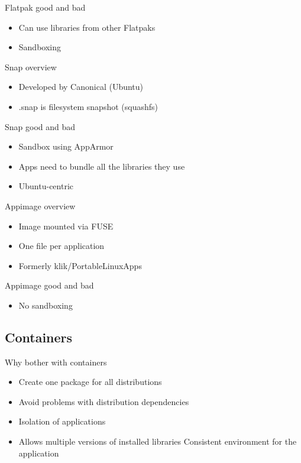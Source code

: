 \documentclass{beamer}
\begin{document}
\begin{frame}[t]{Flatpak good and bad}
	\begin{itemize}
	\item Can use libraries from other Flatpaks
	\item Sandboxing
	\end{itemize}
\end{frame}

\begin{frame}[t]{Snap overview}
	\begin{itemize}
	\item Developed by Canonical (Ubuntu)
	\item .snap is filesystem snapshot (squashfs)
	\end{itemize}
\end{frame}

\begin{frame}[t]{Snap good and bad}
	\begin{itemize}
	\item Sandbox using AppArmor
	\item Apps need to bundle all the libraries they use
	\item Ubuntu-centric
	\end{itemize}
\end{frame}

\begin{frame}[t]{Appimage overview}
	\begin{itemize}
	\item Image mounted via FUSE
	\item One file per application
	\item Formerly klik/PortableLinuxApps
	\end{itemize}
\end{frame}

\begin{frame}[t]{Appimage good and bad}
	\begin{itemize}
	\item No sandboxing
	\end{itemize}
\end{frame}

\subsection{Containers}

\begin{frame}[t]{Why bother with containers}
	\begin{itemize}
	\item Create one package for all distributions
	\item Avoid problems with distribution dependencies
	\item Isolation of applications
	\item Allows multiple versions of installed libraries
	\itme Consistent environment for the application
	\end{itemize}
\end{frame}
\end{document}
